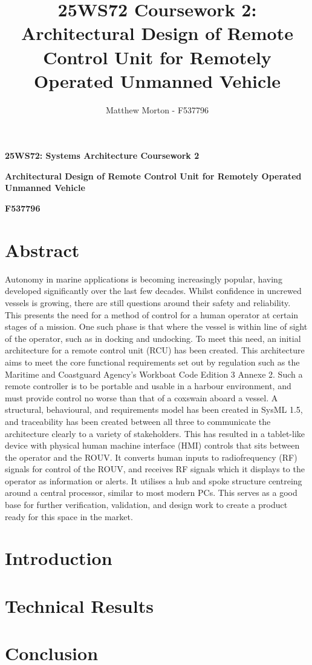 \documentclass[11pt]{article}
\title{25WS72 Coursework 2: Architectural Design of Remote Control Unit for Remotely Operated Unmanned Vehicle}
\author{Matthew Morton - F537796}
\begin{document}
\begin{center}
    \textbf{25WS72: Systems Architecture Coursework 2}

    \textbf{Architectural Design of Remote Control Unit for Remotely Operated Unmanned Vehicle}

    \textbf{F537796}
\end{center}

\linespread{1.15}

\section*{Abstract}

Autonomy in marine applications is becoming increasingly popular, having developed significantly over the last few decades.
Whilst confidence in uncrewed vessels is growing, there are still questions around their safety and reliability.
This presents the need for a method of control for a human operator at certain stages of a mission.
One such phase is that where the vessel is within line of sight of the operator, such as in docking and undocking.
To meet this need, an initial architecture for a remote control unit (RCU) has been created.
This architecture aims to meet the core functional requirements set out by regulation such as the Maritime and Coastguard Agency's Workboat Code Edition 3 Annexe 2.
Such a remote controller is to be portable and usable in a harbour environment, and must provide control no worse than that of a coxswain aboard a vessel.
A structural, behavioural, and requirements model has been created in SysML 1.5, and traceability has been created between all three to communicate the architecture clearly to a variety of stakeholders.
This has resulted in a tablet-like device with physical human machine interface (HMI) controls that sits between the operator and the ROUV\@.
It converts human inputs to radiofrequency (RF) signals for control of the ROUV, and receives RF signals which it displays to the operator as information or alerts.
It utilises a hub and spoke structure centreing around a central processor, similar to most modern PCs.
This serves as a good base for further verification, validation, and design work to create a product ready for this space in the market.

\hrulefill

\tableofcontents

\hrulefill

\clearpage

\section{Introduction}



\clearpage

\section{Technical Results}



\clearpage

\section{Conclusion}



\clearpage

\printbibliography[heading=bibintoc, title=References]{}
\end{document}
